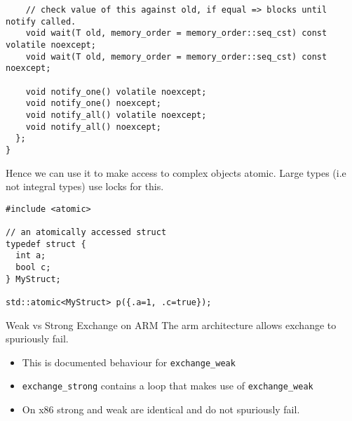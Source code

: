 \begin{verbatim}
    // check value of this against old, if equal => blocks until notify called.
    void wait(T old, memory_order = memory_order::seq_cst) const volatile noexcept;
    void wait(T old, memory_order = memory_order::seq_cst) const noexcept;

    void notify_one() volatile noexcept;
    void notify_one() noexcept;
    void notify_all() volatile noexcept;
    void notify_all() noexcept;
  };
}
\end{verbatim}
Hence we can use it to make access to complex objects atomic. Large types (i.e not integral types) use locks for this.
\begin{verbatim}
#include <atomic>

// an atomically accessed struct
typedef struct {
  int a;
  bool c;
} MyStruct;

std::atomic<MyStruct> p({.a=1, .c=true});
\end{verbatim}
\begin{sidenotebox}{Weak vs Strong Exchange on ARM}
  The arm architecture allows exchange to spuriously fail.
  \begin{itemize}
    \item This is documented behaviour for \texttt{exchange_weak}
    \item \texttt{exchange_strong} contains a loop that makes use of \texttt{exchange_weak}
    \item On x86 strong and weak are identical and do not spuriously fail. 
  \end{itemize}
\end{sidenotebox}
